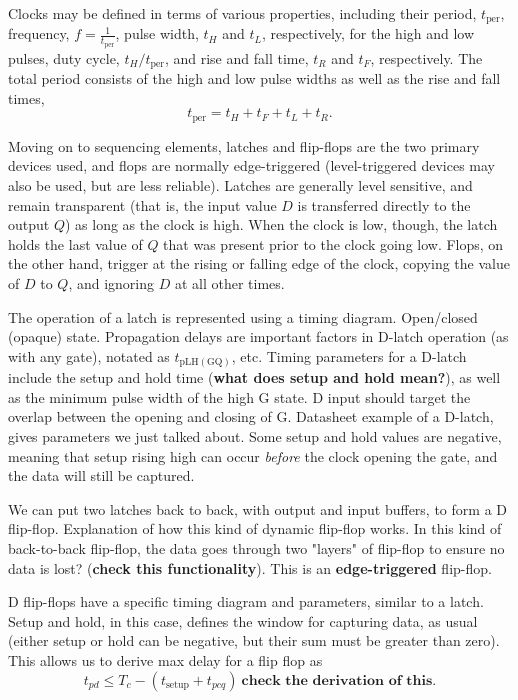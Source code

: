 \documentclass{article}
\begin{document}
Clocks may be defined in terms of various properties, including their period, \(t_{\mathrm{per}}\), frequency, \(f=\frac{1}{t_{\text{per}}}\), pulse width, \(t_H\) and \(t_L\), respectively, for the high and low pulses, duty cycle, \(t_H/t_{\text{per}}\), and rise and fall time, \(t_R\) and \(t_F\), respectively. The total period consists of the high and low pulse widths as well as the rise and fall times,
\[
	t_{\text{per}} = t_H + t_F + t_L + t_R.
\]

Moving on to sequencing elements, latches and flip-flops are the two primary devices used, and flops are normally edge-triggered (level-triggered devices may also be used, but are less reliable). Latches are generally level sensitive, and remain transparent (that is, the input value \(D\) is transferred directly to the output \(Q\)) as long as the clock is high. When the clock is low, though, the latch holds the last value of \(Q\) that was present prior to the clock going low. Flops, on the other hand, trigger at the rising or falling edge of the clock, copying the value of \(D\) to \(Q\), and ignoring \(D\) at all other times. 

The operation of a latch is represented using a timing diagram. Open/closed (opaque) state. Propagation delays are important factors in D-latch operation (as with any gate), notated as \(t_{\mathrm{pLH(GQ)}}\), etc. Timing parameters for a D-latch include the setup and hold time (\textbf{what does setup and hold mean?}), as well as the minimum pulse width of the high G state. D input should target the overlap between the opening and closing of G. Datasheet example of a D-latch, gives parameters we just talked about. Some setup and hold values are negative, meaning that setup rising high can occur \textit{before} the clock opening the gate, and the data will still be captured. 

We can put two latches back to back, with output and input buffers, to form a D flip-flop. Explanation of how this kind of dynamic flip-flop works. In this kind of back-to-back flip-flop, the data goes through two "layers" of flip-flop to ensure no data is lost? (\textbf{check this functionality}). This is an \textbf{edge-triggered} flip-flop.

D flip-flops have a specific timing diagram and parameters, similar to a latch. Setup and hold, in this case, defines the window for capturing data, as usual (either setup or hold can be negative, but their sum must be greater than zero). This allows us to derive max delay for a flip flop as 
\[
	t_{pd} \leq T_c - (t_{\mathrm{setup}} + t_{pcq}) \ \textbf{check the derivation of this}.
\]
\end{document}
